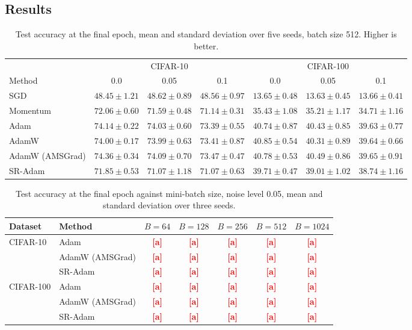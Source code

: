 \documentclass[pdflatex,sn-mathphys-num]{sn-jnl}%
\theoremstyle{thmstyleone}%
\theoremstyle{thmstyletwo}%
\theoremstyle{thmstylethree}%
\newcommand{\torerun}[1]{\textcolor{red}{\textbf{[#1]}}}
\begin{document}
\subsection{Results}

\begin{table}[t]
\centering
\caption{Test accuracy at the final epoch, mean and standard deviation over five seeds, batch size 512. Higher is better.}
\label{tab:main_acc}
\begin{tabular}{lcccccc}
\toprule
 & \multicolumn{3}{c}{CIFAR-10} & \multicolumn{3}{c}{CIFAR-100} \\
\cmidrule(lr){2-4}\cmidrule(lr){5-7}
Method & 0.0 & 0.05 & 0.1 & 0.0 & 0.05 & 0.1 \\
\midrule
SGD              & $48.45\pm1.21$ & $48.62\pm0.89$ & $48.56\pm0.97$ & $13.65\pm0.48$ & $13.63\pm0.45$ & $13.66\pm0.41$ \\
Momentum         & $72.06\pm0.60$ & $71.59\pm0.48$ & $71.14\pm0.31$ & $35.43\pm1.08$ & $35.21\pm1.17$ & $34.71\pm1.16$ \\
Adam             & $74.14\pm0.22$ & $74.03\pm0.60$ & $73.39\pm0.55$ & $40.74\pm0.87$ & $40.43\pm0.85$ & $39.63\pm0.77$ \\
AdamW            & $74.00\pm0.17$ & $73.99\pm0.63$ & $73.41\pm0.87$ & $40.85\pm0.54$ & $40.31\pm0.89$ & $39.64\pm0.66$ \\
AdamW (AMSGrad)  & $\bm{74.36}\pm0.34$ & $\bm{74.09}\pm0.70$ & $\bm{73.47}\pm0.47$ & $40.78\pm0.53$ & $\bm{40.49}\pm0.86$ & $\bm{39.65}\pm0.91$ \\
SR-Adam          & $71.85\pm0.53$ & $71.07\pm1.18$ & $71.07\pm0.63$ & $39.71\pm0.47$ & $39.01\pm1.02$ & $38.74\pm1.16$ \\
\bottomrule
\end{tabular}
\end{table}

\begin{table}[t]
\centering
\caption{Test accuracy at the final epoch against mini-batch size, noise level 0.05, mean and standard deviation over three seeds.}
\label{tab:batch_cifar}
\begin{tabular}{llccccc}
\toprule
Dataset & Method & $B=64$ & $B=128$ & $B=256$ & $B=512$ & $B=1024$ \\
\midrule
\multirow{3}{*}{CIFAR-10}
 & Adam            & \torerun{a} & \torerun{a} & \torerun{a} & \torerun{a} & \torerun{a} \\
 & AdamW (AMSGrad) & \torerun{a} & \torerun{a} & \torerun{a} & \torerun{a} & \torerun{a} \\
 & SR-Adam         & \torerun{a} & \torerun{a} & \torerun{a} & \torerun{a} & \torerun{a} \\
\midrule
\multirow{3}{*}{CIFAR-100}
 & Adam            & \torerun{a} & \torerun{a} & \torerun{a} & \torerun{a} & \torerun{a} \\
 & AdamW (AMSGrad) & \torerun{a} & \torerun{a} & \torerun{a} & \torerun{a} & \torerun{a} \\
 & SR-Adam         & \torerun{a} & \torerun{a} & \torerun{a} & \torerun{a} & \torerun{a} \\
\bottomrule
\end{tabular}
\end{table}
\end{document}
